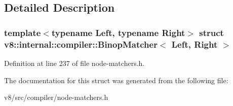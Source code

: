 \subsection{Detailed Description}
\subsubsection*{template$<$typename Left, typename Right$>$\newline
struct v8\+::internal\+::compiler\+::\+Binop\+Matcher$<$ Left, Right $>$}



Definition at line 237 of file node-\/matchers.\+h.



The documentation for this struct was generated from the following file\+:\begin{DoxyCompactItemize}
\item 
v8/src/compiler/node-\/matchers.\+h\end{DoxyCompactItemize}
